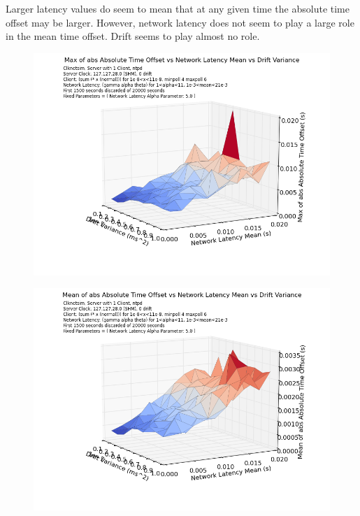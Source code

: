 Larger latency values do seem to mean that at any given time the
absolute time offset may be larger. However, network latency does not
seem to play a large role in the mean time offset. Drift seems to play
almost no role.


\begin{figure}[h]
  \includegraphics[width=0.8\linewidth]{max_abs_time-latency_mean-drift_var.png}
\end{figure}

\begin{figure}[h]
  \includegraphics[width=0.8\linewidth]{mean_abs_time-mean_latency-drift_var.png}
\end{figure}




